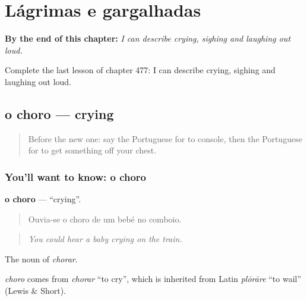 
\chapter{Lágrimas e gargalhadas}
\label{ch:pt-lagrimas-e-gargalhadas}

\begin{chapteropening}
\textbf{By the end of this chapter:} \emph{I can describe crying, sighing and laughing out loud.}

Complete the last lesson of chapter 477: I can describe crying, sighing and laughing out loud.
\end{chapteropening}

\section[o choro]{o choro — crying}

\label{lesson:PT-C477-choro}



\begin{quote}
Before the new one: say the Portuguese for to console, then the Portuguese for to get something off your chest.
\end{quote}

\subsection*{You'll want to know: o choro}
\textbf{o choro} — \textquotedblleft{}crying\textquotedblright{}.

\begin{quote}
Ouvia-se o choro de um bebé no comboio.
\end{quote}

\begin{quote}
\emph{You could hear a baby crying on the train.}
\end{quote}

The noun of \emph{chorar}.

\begin{cousinweb}
\emph{choro} comes from \emph{chorar} \textquotedblleft{}to cry\textquotedblright{}, which is inherited from Latin \emph{plōrāre} \textquotedblleft{}to wail\textquotedblright{} (Lewis \& Short).
\end{cousinweb}


